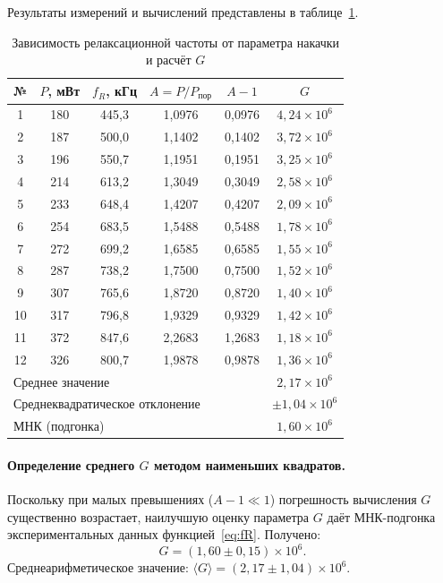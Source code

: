 \documentclass[12pt,a4paper]{article}
\begin{document}
Результаты измерений и вычислений представлены в таблице~\ref{tab:task1}.

\begin{table}[H]
  \centering
  \caption{Зависимость релаксационной частоты от параметра накачки и расчёт $G$}
  \label{tab:task1}
  \begin{tabular}{cccccc}
    \toprule
    № & $P$, мВт & $f_R$, кГц & $A = P/P_\text{пор}$ & $A-1$ & $G$\\
    \midrule
    1  & 180 & 445,3 & 1,0976 & 0,0976 & $4{,}24\times10^6$ \\
    2  & 187 & 500,0 & 1,1402 & 0,1402 & $3{,}72\times10^6$ \\
    3  & 196 & 550,7 & 1,1951 & 0,1951 & $3{,}25\times10^6$ \\
    4  & 214 & 613,2 & 1,3049 & 0,3049 & $2{,}58\times10^6$ \\
    5  & 233 & 648,4 & 1,4207 & 0,4207 & $2{,}09\times10^6$ \\
    6  & 254 & 683,5 & 1,5488 & 0,5488 & $1{,}78\times10^6$ \\
    7  & 272 & 699,2 & 1,6585 & 0,6585 & $1{,}55\times10^6$ \\
    8  & 287 & 738,2 & 1,7500 & 0,7500 & $1{,}52\times10^6$ \\
    9  & 307 & 765,6 & 1,8720 & 0,8720 & $1{,}40\times10^6$ \\
    10 & 317 & 796,8 & 1,9329 & 0,9329 & $1{,}42\times10^6$ \\
    11 & 372 & 847,6 & 2,2683 & 1,2683 & $1{,}18\times10^6$ \\
    12 & 326 & 800,7 & 1,9878 & 0,9878 & $1{,}36\times10^6$ \\
    \midrule
    \multicolumn{5}{l}{Среднее значение} & $2{,}17\times10^6$ \\
    \multicolumn{5}{l}{Среднеквадратическое отклонение} & $\pm1{,}04\times10^6$ \\
    \multicolumn{5}{l}{МНК (подгонка)} & $1{,}60\times10^6$ \\
    \bottomrule
  \end{tabular}
\end{table}

\paragraph{Определение среднего $G$ методом наименьших квадратов.}

Поскольку при малых превышениях ($A-1 \ll 1$) погрешность вычисления $G$
существенно возрастает, наилучшую оценку параметра $G$ даёт МНК-подгонка
экспериментальных данных функцией~\eqref{eq:fR}. Получено:
\begin{equation}
  \boxed{G = (1{,}60 \pm 0{,}15)\times 10^6.}
  \label{eq:G_result}
\end{equation}
Среднеарифметическое значение: $\langle G \rangle = (2{,}17 \pm 1{,}04)\times 10^6$.
\end{document}
